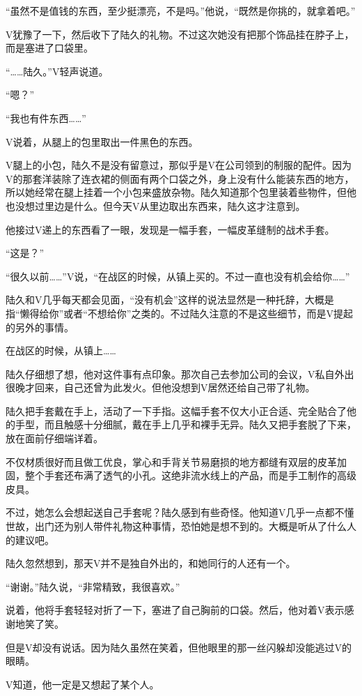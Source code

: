 “虽然不是值钱的东西，至少挺漂亮，不是吗。”他说，“既然是你挑的，就拿着吧。”

V犹豫了一下，然后收下了陆久的礼物。不过这次她没有把那个饰品挂在脖子上，而是塞进了口袋里。

“……陆久。”V轻声说道。

“嗯？”

“我也有件东西……”

V说着，从腿上的包里取出一件黑色的东西。

V腿上的小包，陆久不是没有留意过，那似乎是V在公司领到的制服的配件。因为V的那套洋装除了连衣裙的侧面有两个口袋之外，身上没有什么能装东西的地方，所以她经常在腿上挂着一个小包来盛放杂物。陆久知道那个包里装着些物件，但他也没想过里边是什么。但今天V从里边取出东西来，陆久这才注意到。

他接过V递上的东西看了一眼，发现是一幅手套，一幅皮革缝制的战术手套。

“这是？”

“很久以前……”V说，“在战区的时候，从镇上买的。不过一直也没有机会给你……”

陆久和V几乎每天都会见面，“没有机会”这样的说法显然是一种托辞，大概是指“懒得给你”或者“不想给你”之类的。不过陆久注意的不是这些细节，而是V提起的另外的事情。

在战区的时候，从镇上……

陆久仔细想了想，他对这件事有点印象。那次自己去参加公司的会议，V私自外出很晚才回来，自己还曾为此发火。但他没想到V居然还给自己带了礼物。

陆久把手套戴在手上，活动了一下手指。这幅手套不仅大小正合适、完全贴合了他的手型，而且触感十分细腻，戴在手上几乎和裸手无异。陆久又把手套脱了下来，放在面前仔细端详着。

不仅材质很好而且做工优良，掌心和手背关节易磨损的地方都缝有双层的皮革加固，整个手套还布满了透气的小孔。这绝非流水线上的产品，而是手工制作的高级皮具。

不过，她怎么会想起送自己手套呢？陆久感到有些奇怪。他知道V几乎一点都不懂世故，出门还为别人带件礼物这种事情，恐怕她是想不到的。大概是听从了什么人的建议吧。

陆久忽然想到，那天V并不是独自外出的，和她同行的人还有一个。

“谢谢。”陆久说，“非常精致，我很喜欢。”

说着，他将手套轻轻对折了一下，塞进了自己胸前的口袋。然后，他对着V表示感谢地笑了笑。

但是V却没有说话。因为陆久虽然在笑着，但他眼里的那一丝闪躲却没能逃过V的眼睛。

V知道，他一定是又想起了某个人。

